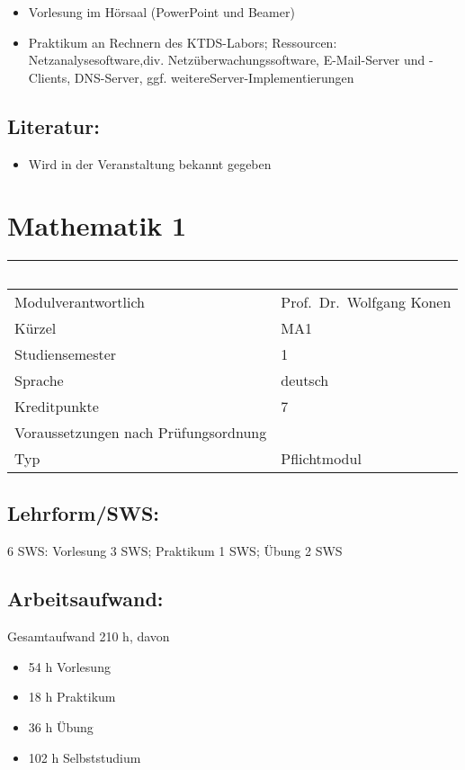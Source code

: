 \begin{itemize}
\item
  Vorlesung im Hörsaal (PowerPoint und Beamer)
\item
  Praktikum an Rechnern des KTDS-Labors; Ressourcen:
  Netzanalysesoftware,div. Netzüberwachungssoftware, E-Mail-Server und
  -Clients, DNS-Server, ggf. weitereServer-Implementierungen
\end{itemize}

\section*{Literatur:}\label{literatur-9}

\begin{itemize}
\tightlist
\item
  Wird in der Veranstaltung bekannt gegeben
\end{itemize}

\chapter{Mathematik 1}\label{mathematik-1}

\begin{longtable}[]{@{}ll@{}}
\toprule
~ & ~\tabularnewline
\midrule
\endhead
Modulverantwortlich & Prof.~Dr.~Wolfgang Konen\tabularnewline
Kürzel & MA1\tabularnewline
Studiensemester & 1\tabularnewline
Sprache & deutsch\tabularnewline
Kreditpunkte & 7\tabularnewline
Voraussetzungen nach Prüfungsordnung & ~\tabularnewline
Typ & Pflichtmodul\tabularnewline
\bottomrule
\end{longtable}

\section*{Lehrform/SWS:}\label{lehrformsws-13}

6 SWS: Vorlesung 3 SWS; Praktikum 1 SWS; Übung 2 SWS

\section*{Arbeitsaufwand:}\label{arbeitsaufwand-12}

Gesamtaufwand 210 h, davon

\begin{itemize}
\item
  54 h Vorlesung
\item
  18 h Praktikum
\item
  36 h Übung
\item
  102 h Selbststudium
\end{itemize}

